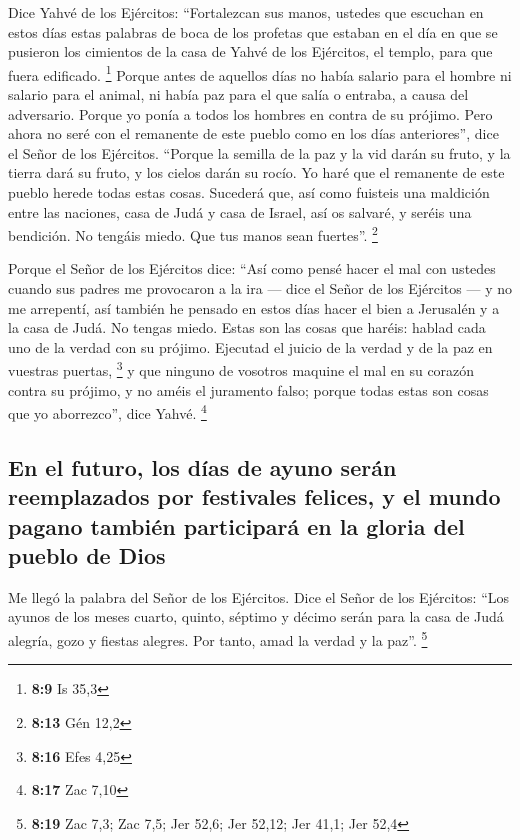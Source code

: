 \begin{paracol}{2}
 Dice Yahvé de los Ejércitos: ``Fortalezcan sus manos,
ustedes que escuchan en estos días estas palabras de boca de los
profetas que estaban en el día en que se pusieron los cimientos de la
casa de Yahvé de los Ejércitos, el templo, para que fuera edificado.
\footnote{\textbf{8:9} Is 35,3}  Porque antes de aquellos
días no había salario para el hombre ni salario para el animal, ni había
paz para el que salía o entraba, a causa del adversario. Porque yo ponía
a todos los hombres en contra de su prójimo.  Pero ahora
no seré con el remanente de este pueblo como en los días anteriores'',
dice el Señor de los Ejércitos.  ``Porque la semilla de
la paz y la vid darán su fruto, y la tierra dará su fruto, y los cielos
darán su rocío. Yo haré que el remanente de este pueblo herede todas
estas cosas.  Sucederá que, así como fuisteis una
maldición entre las naciones, casa de Judá y casa de Israel, así os
salvaré, y seréis una bendición. No tengáis miedo. Que tus manos sean
fuertes''. \footnote{\textbf{8:13} Gén 12,2}

 Porque el Señor de los Ejércitos dice: ``Así como pensé
hacer el mal con ustedes cuando sus padres me provocaron a la ira ---
dice el Señor de los Ejércitos --- y no me arrepentí, 
así también he pensado en estos días hacer el bien a Jerusalén y a la
casa de Judá. No tengas miedo.  Estas son las cosas que
haréis: hablad cada uno de la verdad con su prójimo. Ejecutad el juicio
de la verdad y de la paz en vuestras puertas, \footnote{\textbf{8:16}
  Efes 4,25}  y que ninguno de vosotros maquine el mal en
su corazón contra su prójimo, y no améis el juramento falso; porque
todas estas son cosas que yo aborrezco'', dice Yahvé. \footnote{\textbf{8:17}
  Zac 7,10}

\hypertarget{en-el-futuro-los-duxedas-de-ayuno-seruxe1n-reemplazados-por-festivales-felices-y-el-mundo-pagano-tambiuxe9n-participaruxe1-en-la-gloria-del-pueblo-de-dios}{%
\subsection{En el futuro, los días de ayuno serán reemplazados por
festivales felices, y el mundo pagano también participará en la gloria
del pueblo de
Dios}\label{en-el-futuro-los-duxedas-de-ayuno-seruxe1n-reemplazados-por-festivales-felices-y-el-mundo-pagano-tambiuxe9n-participaruxe1-en-la-gloria-del-pueblo-de-dios}}

 Me llegó la palabra del Señor de los Ejércitos.
 Dice el Señor de los Ejércitos: ``Los ayunos de los
meses cuarto, quinto, séptimo y décimo serán para la casa de Judá
alegría, gozo y fiestas alegres. Por tanto, amad la verdad y la paz''.
\footnote{\textbf{8:19} Zac 7,3; Zac 7,5; Jer 52,6; Jer 52,12; Jer 41,1;
  Jer 52,4}


\end{paracol}
